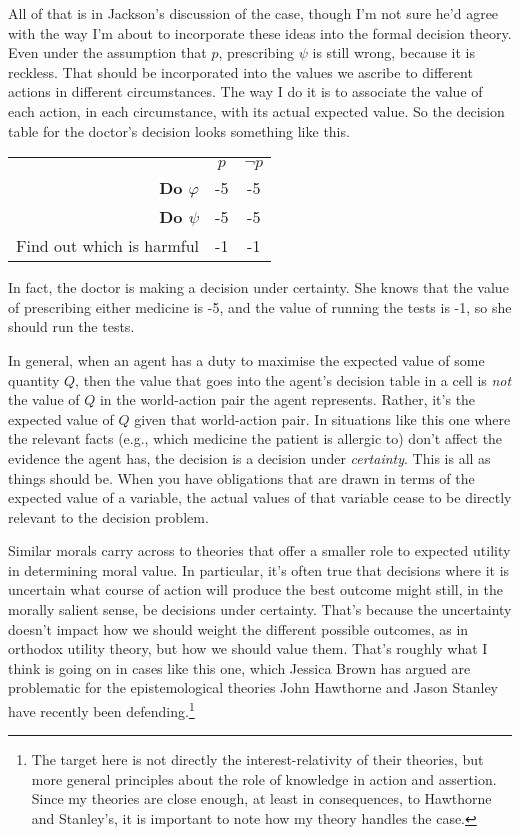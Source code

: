 \documentclass[11pt,oneside]{book}
\begin{document}
All of that is in Jackson's discussion of the case, though I'm not sure he'd agree with the way I'm about to incorporate these ideas into the formal decision theory. Even under the assumption that $p$, prescribing $\psi$ is still wrong, because it is reckless. That should be incorporated into the values we ascribe to different actions in different circumstances. The way I do it is to associate the value of each action, in each circumstance, with its actual expected value. So the decision table for the doctor's decision looks something like this.

\begin{center}
\begin{tabular}{r c c}
 & $p$ & $\neg p$ \\
\textbf{Do $\varphi$} & -5 & -5 \\
\textbf{Do $\psi$} & -5 & -5 \\
Find out which is harmful & -1 & -1 \\
\end{tabular}
\end{center}

\noindent In fact, the doctor is making a decision under certainty. She knows that the value of prescribing either medicine is -5, and the value of running the tests is -1, so she should run the tests.

In general, when an agent has a duty to maximise the expected value of some quantity $Q$, then the value that goes into the agent's decision table in a cell is \textit{not} the value of $Q$ in the world-action pair the agent represents. Rather, it's the expected value of $Q$ given that world-action pair. In situations like this one where the relevant facts (e.g., which medicine the patient is allergic to) don't affect the evidence the agent has, the decision is a decision under \textit{certainty}. This is all as things should be. When you have obligations that are drawn in terms of the expected value of a variable, the actual values of that variable cease to be directly relevant to the decision problem.

Similar morals carry across to theories that offer a smaller role to expected utility in determining moral value. In particular, it's often true that decisions where it is uncertain what course of action will produce the best outcome might still, in the morally salient sense, be decisions under certainty. That's because the uncertainty doesn't impact how we should weight the different possible outcomes, as in orthodox utility theory, but how we should value them. That's roughly what I think is going on in cases like this one, which Jessica Brown has argued are problematic for the epistemological theories John Hawthorne and Jason Stanley have recently been defending.\footnote{The target here is not directly the interest-relativity of their theories, but more general principles about the role of knowledge in action and assertion. Since my theories are close enough, at least in consequences, to Hawthorne and Stanley's, it is important to note how my theory handles the case.}
\end{document}
